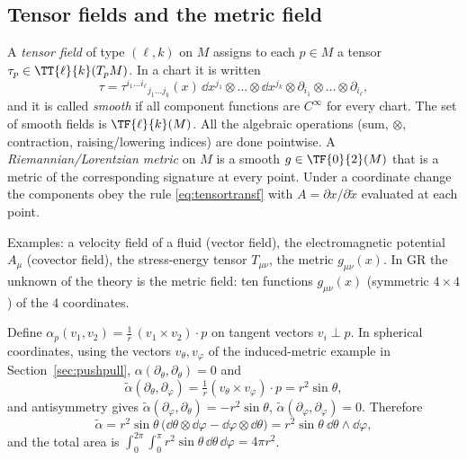 \subsection{Tensor fields and the metric field}\label{sec:tensorfields}
\begin{formal}
A \emph{tensor field} of type $(\ell,k)$ on $M$ assigns to each $p\in M$ a tensor $\tau_p\in\TT{\ell}{k}(T_pM)$. In a chart it is written
\[
\tau=\tau^{i_1\dots i_\ell}{}_{j_1\dots j_k}(x)\,\dd x^{j_1}\otimes\dots\otimes\dd x^{j_k}\otimes\partial_{i_1}\otimes\dots\otimes\partial_{i_\ell},
\]
and it is called \emph{smooth} if all component functions are $C^\infty$ for every chart. The set of smooth fields is $\TF{\ell}{k}(M)$. All the algebraic operations (sum, $\otimes$, contraction, raising/lowering indices) are done pointwise. A \emph{Riemannian/Lorentzian metric} on $M$ is a smooth $g\in\TF{0}{2}(M)$ that is a metric of the corresponding signature at every point. Under a coordinate change the components obey the rule \eqref{eq:tensortransf} with $A=\partial x/\partial\tilde x$ evaluated at each point.
\end{formal}
\begin{intuition}[{a field = a tensor at every point, varying smoothly}]
Examples: a velocity field of a fluid (vector field), the electromagnetic potential $A_\mu$ (covector field), the stress-energy tensor $T_{\mu\nu}$, the metric $g_{\mu\nu}(x)$. In GR the unknown of the theory is the metric field: ten functions $g_{\mu\nu}(x)$ (symmetric $4\times4$) of the 4 coordinates.
\end{intuition}

\begin{example}\label{ex:sphereareaform}
Define $\alpha_p(v_1,v_2)=\frac1r\,(v_1\times v_2)\cdot p$ on tangent vectors $v_i\perp p$. In spherical coordinates, using the vectors $v_\theta,v_\varphi$ of the induced-metric example in Section~\ref{sec:pushpull}, $\alpha(\partial_\theta,\partial_\theta)=0$ and
\[
\tilde\alpha(\partial_\theta,\partial_\varphi)=\tfrac1r(v_\theta\times v_\varphi)\cdot p=r^2\sin\theta,
\]
and antisymmetry gives $\tilde\alpha(\partial_\varphi,\partial_\theta)=-r^2\sin\theta$, $\tilde\alpha(\partial_\varphi,\partial_\varphi)=0$. Therefore
\[
\tilde\alpha=r^2\sin\theta\,\big(\dd\theta\otimes\dd\varphi-\dd\varphi\otimes\dd\theta\big)=r^2\sin\theta\ \dd\theta\wedge\dd\varphi,
\]
and the total area is $\int_0^{2\pi}\!\!\int_0^\pi r^2\sin\theta\,\dd\theta\,\dd\varphi=4\pi r^2$. \checkmark
\end{example}

